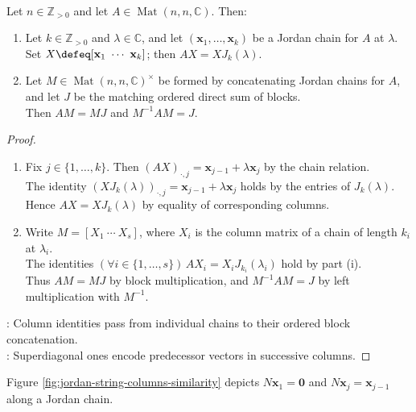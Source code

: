 \begin{proposition} \label{prop:jordan-chains-as-matrix-columns} \\
Let $n\in\mathbb{Z}_{>0}$ and let $A\in\operatorname{Mat}(n,n,\mathbb{C})$. Then:
\begin{enumerate}[label=(\roman*)]
\setlength{\itemsep}{0pt}
\item Let $k\in\mathbb{Z}_{>0}$ and $\lambda\in\mathbb{C}$, and let $(\mathbf{x}_1,\ldots,\mathbf{x}_k)$ be a Jordan chain for $A$ at $\lambda$. Set $X\defeq[\mathbf{x}_1\ \cdots\ \mathbf{x}_k]$; then $AX=XJ_k(\lambda)$.
\item Let $M\in\operatorname{Mat}(n,n,\mathbb{C})^{\times}$ be formed by concatenating Jordan chains for $A$, and let $J$ be the matching ordered direct sum of blocks.\\
Then $AM=MJ$ and $M^{-1}AM=J$.
\end{enumerate}
\begin{proof}
\begin{enumerate}[label=(\roman*)]
\setlength{\itemsep}{0pt}
\item Fix $j\in\{1,\ldots,k\}$. Then $(AX)_{\cdot,j}=\mathbf{x}_{j-1}+\lambda\mathbf{x}_j$ by the chain relation.\\
The identity $(XJ_k(\lambda))_{\cdot,j}=\mathbf{x}_{j-1}+\lambda\mathbf{x}_j$ holds by the entries of $J_k(\lambda)$. Hence $AX=XJ_k(\lambda)$ by equality of corresponding columns.
\item Write $M=[X_1\ \cdots\ X_s]$, where $X_i$ is the column matrix of a chain of length $k_i$ at $\lambda_i$.\\
The identities $(\forall i\in\{1,\ldots,s\})\,AX_i=X_iJ_{k_i}(\lambda_i)$ hold by part (i).\\
Thus $AM=MJ$ by block multiplication, and $M^{-1}AM=J$ by left multiplication with $M^{-1}$.
\end{enumerate}
: Column identities pass from individual chains to their ordered block concatenation.\\
: Superdiagonal ones encode predecessor vectors in successive columns.
\end{proof}
\end{proposition}

Figure \ref{fig:jordan-string-columns-similarity} depicts $N\mathbf{x}_1=\mathbf{0}$ and $N\mathbf{x}_j=\mathbf{x}_{j-1}$ along a Jordan chain.

\begin{illustrationfigure}[H]
  \centering
  
  \caption{A Jordan chain for $N=A-\lambda I$; each arrow records the image under $N$.}
  \label{fig:jordan-string-columns-similarity}
\end{illustrationfigure}

